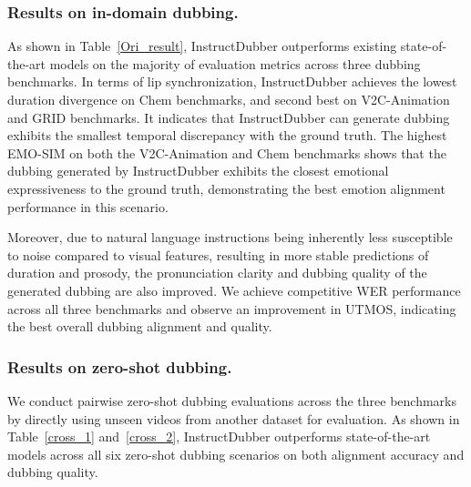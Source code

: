 \subsubsection{Results on in-domain dubbing.}
As shown in Table~\ref{Ori_result}, InstructDubber outperforms existing state-of-the-art models on the majority of evaluation metrics across three dubbing benchmarks.
In terms of lip synchronization, InstructDubber achieves the lowest duration divergence on Chem benchmarks, and second best on V2C-Animation and GRID benchmarks.
It indicates that InstructDubber can generate dubbing exhibits the smallest temporal discrepancy with the ground truth.
The highest EMO-SIM on both the V2C-Animation and Chem benchmarks shows that the dubbing generated by InstructDubber exhibits the closest emotional expressiveness to the ground truth, demonstrating the best emotion alignment performance in this scenario.

Moreover, due to natural language instructions being inherently less susceptible to noise compared to visual features, resulting in more stable predictions of duration and prosody, the pronunciation clarity and dubbing quality of the generated dubbing are also improved.
We achieve competitive WER performance across all three benchmarks and observe an improvement in UTMOS, indicating the best overall dubbing alignment and quality.

\subsubsection{Results on zero-shot dubbing.}
We conduct pairwise zero-shot dubbing evaluations across the three benchmarks by directly using unseen videos from another dataset for evaluation.
As shown in Table~\ref{cross_1} and~\ref{cross_2}, InstructDubber outperforms state-of-the-art models across all six zero-shot dubbing scenarios on both alignment accuracy and dubbing quality.

